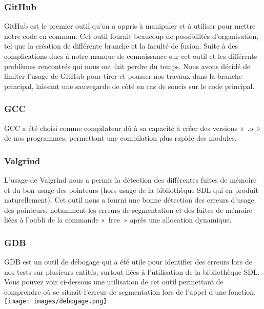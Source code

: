 \documentclass[12pt,a4paper]{article}
\begin{document}
            \subsubsection{GitHub}
                \tabto{1cm} GitHub est le premier outil qu’on a appris à manipuler et à utiliser pour mettre notre code en commun. Cet outil fournit beaucoup de possibilités d’organisation, tel que la création de différente branche et la faculté de fusion. Suite à des complications dues à notre manque de connaissance sur cet outil et les différents problèmes rencontrés qui nous ont fait perdre du temps. Nous avons décidé de limiter l’usage de GitHub pour tirer et pousser nos travaux dans la branche principal, laissant une sauvegarde de côté en cas de soucis sur le code principal.

            \subsubsection{GCC}
                    \tabto{1cm} GCC a été choisi comme compilateur dû à sa capacité à créer des versions «~.o~» de nos programmes, permettant une compilation plus rapide des modules.
            
            \subsubsection{Valgrind}
                \tabto{1cm} L’usage de Valgrind nous a permis la détection des différentes fuites de mémoire et du bon usage des pointeurs (hors usage de la bibliothèque SDL qui en produit naturellement). Cet outil nous a fourni une bonne détection des erreurs d’usage des pointeurs, notamment les erreurs de segmentation et des fuites de mémoire liées à l’oubli de la commande «~free~» après une allocation dynamique.
                
            \subsubsection{GDB}
                \tabto{1cm} GDB est un outil de débogage qui a été utile pour identifier des erreurs lors de nos tests sur plusieurs entités, surtout liées à l’utilisation de la bibliothèque SDL. Vous pouvez voir ci-dessous une utilisation de cet outil permettant de comprendre où se situait l’erreur de segmentation lors de l’appel d’une fonction.\\

                \texttt{[image: images/debogage.png]}\\
                
\end{document}
